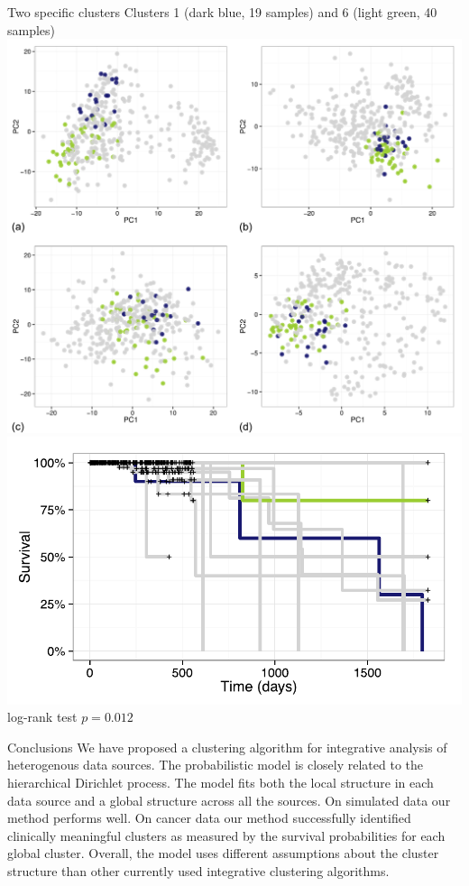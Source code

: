 \documentclass[t, final]{beamer}
\begin{document}
\begin{frame}{}
\begin{columns}[t]
\begin{column}{.32\linewidth}
\begin{block}{Two specific clusters}
  Clusters 1 (dark blue, 19 samples) and 6 (light green, 40 samples)
  \includegraphics[width=\textwidth]{Figures/breast-PCA-two} \\
  \includegraphics[width=\textwidth]{Figures/breast-survival-two} \\
  log-rank test $p = 0.012$
\end{block}

\begin{block}{Conclusions}
  We have proposed a clustering algorithm for integrative analysis of
  heterogenous data sources. The probabilistic model is closely related
  to the hierarchical Dirichlet process. The model fits both the local
  structure in each data source and a global structure across all the
  sources. On simulated data our method performs well. On cancer data
  our method successfully identified clinically meaningful clusters as
  measured by the survival probabilities for each global cluster.
  Overall, the model uses different assumptions about the cluster structure
  than other currently used integrative clustering algorithms.
\end{block}


\end{column}
\end{columns}
\end{frame}
\end{document}
